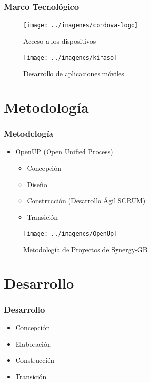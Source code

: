 \documentclass{beamer}
\begin{document}
\begin{frame}[fragile]
\frametitle{Marco Tecnológico}

\begin{figure}[H]
  \texttt{[image: ../imagenes/cordova-logo]}
  \caption*{Acceso a los dispositivos}
\end{figure}

\begin{figure}[H]
  \texttt{[image: ../imagenes/kiraso]}
  \caption*{Desarrollo de aplicaciones móviles}
\end{figure}


\end{frame}


\section{Metodología}


\begin{frame}[fragile]
\frametitle{Metodología}
\begin{itemize}
	\item OpenUP (Open Unified Process)
	\begin{itemize}
		\item Concepción
		\item Diseño
		\item Construcción (Desarrollo Ágil SCRUM)
		\item Transición
	\end{itemize} 
\end{itemize}

\begin{figure}[H]
  \texttt{[image: ../imagenes/OpenUp]}
  \caption*{Metodología de Proyectos de Synergy-GB}
\end{figure}

\end{frame}



\section{Desarrollo}


\begin{frame}[fragile]
\frametitle{Desarrollo}
\begin{itemize}
	
	\item Concepción
	\item Elaboración
	\item Construcción 
	\item Transición
	 
\end{itemize}

\end{frame}
\end{document}
